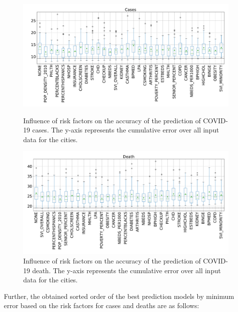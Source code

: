 \documentclass[letterpaper, inpress]{jds} %
\renewcommand{\_}{%
    \textunderscore\hspace{0pt}%
}
\begin{document}
\begin{figure}[!p]
    \centering
    \includegraphics[width=1.0\textwidth]{images/boxwhisker/boxplot_casesNEW.pdf}
    \vspace{-1cm}
    \caption{Influence of risk factors on the accuracy of the
      prediction of COVID-19 cases. The y-axis represents the
      cumulative error over all input data for the cities.}
    \label{fig:box-cases}
    \bigskip

    \includegraphics[width=1.0\textwidth]{images/boxwhisker/boxplot_deathNEW.pdf}
    \vspace{-1cm}
    \caption{Influence of risk factors on the accuracy of the
      prediction of COVID-19 death. The y-axis represents the
      cumulative error over all input data for the cities.}
    \label{fig:box-death}
\end{figure}



Further, the obtained sorted order of the best prediction models by
minimum error based on the risk factors for cases and deaths are as
follows:
\end{document}
